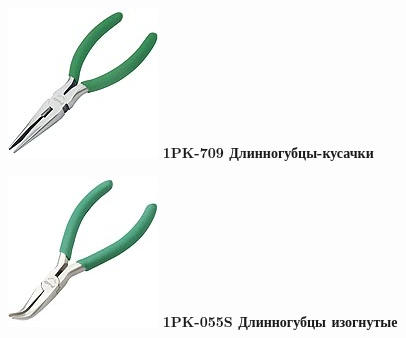 \documentclass{magazine}
\begin{document}
{\begin{multicols}{2}
\noindent\includegraphics[width=\columnwidth]{fig/00/pros/1PK-709.jpg}
\textbf{1PK-709 Длинногубцы-кусачки}

\noindent\includegraphics[width=\columnwidth]{fig/00/pros/1PK-055S.jpg}
\textbf{1PK-055S Длинногубцы изогнутые}


\end{multicols}}
\end{document}
